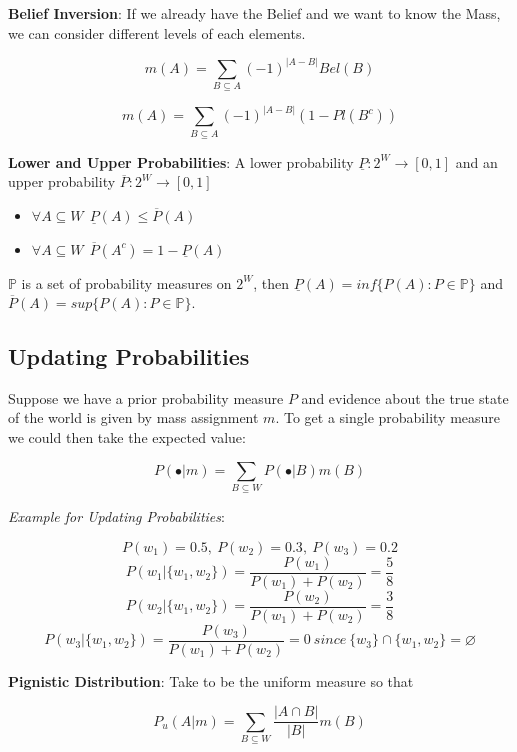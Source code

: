 \documentclass{article}
\begin{document}
\textbf{Belief Inversion}: If we already have the Belief and we want to know the Mass, we can consider different levels of each elements.

\begin{equation}
    m(A) = \sum_{B \subseteq A}(-1)^{|A - B|}Bel(B)
\end{equation}

\begin{equation}
    m(A) = \sum_{B \subseteq A}(-1)^{|A - B|}(1 - Pl(B^c))
\end{equation}

\textbf{Lower and Upper Probabilities}: A lower probability $\underline{P}: 2^W \rightarrow [0, 1]$ and an upper probability $\overline{P}: 2^W \rightarrow [0, 1]$
\begin{itemize}
    \item $\forall A \subseteq W\ \ \underline{P}(A) \leq \overline{P}(A)$
    \item $\forall A \subseteq W\ \ \overline{P}(A^c) = 1 - \underline{P}(A)$
\end{itemize}

$\mathbb{P}$ is a set of probability measures on $2^W$, then $\underline{P}(A) = inf \{ P(A): P \in \mathbb{P} \}$ and $\overline{P}(A) = sup\{ P(A): P \in \mathbb{P} \}$.


\subsection{Updating Probabilities}

Suppose we have a prior probability measure $P$ and evidence about the true state of the world is given by mass assignment $m$. To get a single probability measure we could then take the expected value:

\begin{equation}
    P( \bullet | m) = \sum_{B \subseteq W}P(\bullet | B)m(B) 
\end{equation}

\textit{Example for Updating Probabilities}:

$$P(w_1)=0.5,\ P(w_2)=0.3,\ P(w_3)=0.2$$
$$P(w_1 | \{w_1, w_2\}) = \frac{P(w_1)}{P(w_1) + P(w_2)} = \frac{5}{8}$$
$$P(w_2 | \{w_1, w_2\}) = \frac{P(w_2)}{P(w_1) + P(w_2)} = \frac{3}{8}$$
$$P(w_3 | \{w_1, w_2\}) = \frac{P(w_3)}{P(w_1) + P(w_2)} = 0 \ since\ \{w_3\} \cap \{w_1, w_2\} = \varnothing$$

\textbf{Pignistic Distribution}: Take  to be the uniform measure so that

\begin{equation}
    P_u(A | m) = \sum_{B \subseteq W}\frac{|A \cap B|}{|B|}m(B)
\end{equation}
\end{document}
